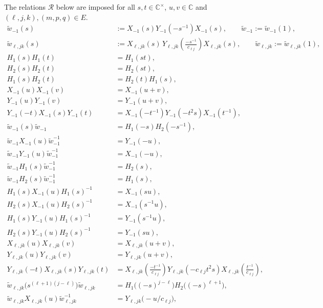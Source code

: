 \documentclass[11pt]{article}
\theoremstyle{definition}
\theoremstyle{remark}
\newcommand{\Cx}{\mathbb{C}^\times}
\newcommand{\wt}{\widetilde{w}}
\begin{document}
The relations $\mathcal R$ below are imposed for all $s,t\in\Cx$, $u,v\in\mathbb C$ and $(\ell,j,k),(m,p,q)\in E$.
\begin{align*}
\tag{Re:0} \wt_{-1}(s)&:=X_{-1}(s)Y_{-1}(-s^{-1})X_{-1}(s),\qquad \wt_{-1}:=\wt_{-1}(1),\\
\tag{Im:0} \wt_{\ell,jk}(s)&:=X_{\ell,jk}(s)\,Y_{\ell,jk}\!\left(\tfrac{-s^{-1}}{c_{\ell j}}\right)X_{\ell,jk}(s),\qquad \wt_{\ell,jk}:=\wt_{\ell,jk}(1),\\
\tag{H:1a} H_1(s)H_1(t)&=H_1(st),\\
\tag{H:1b} H_2(s)H_2(t)&=H_2(st),\\
\tag{H:2} H_1(s)H_2(t)&=H_2(t)H_1(s),\\
\tag{Re:1a} X_{-1}(u)X_{-1}(v)&=X_{-1}(u+v),\\
\tag{Re:1b} Y_{-1}(u)Y_{-1}(v)&=Y_{-1}(u+v),\\
\tag{Re:2} Y_{-1}(-t)X_{-1}(s)Y_{-1}(t)&=X_{-1}(-t^{-1})Y_{-1}(-t^2s)X_{-1}(t^{-1}),\\
\tag{Re:3} \wt_{-1}(s)\wt_{-1}&=H_1(-s)H_2(-s^{-1}),\\
\tag{Re:4a} \wt_{-1}X_{-1}(u)\wt_{-1}^{-1}&=Y_{-1}(-u),\\
\tag{Re:4b} \wt_{-1}Y_{-1}(u)\wt_{-1}^{-1}&=X_{-1}(-u),\\
\tag{Re:5a} \wt_{-1}H_1(s)\wt_{-1}^{-1}&=H_2(s),\\
\tag{Re:5b} \wt_{-1}H_2(s)\wt_{-1}^{-1}&=H_1(s),\\
\tag{Re:6a} H_1(s)X_{-1}(u)H_1(s)^{-1}&=X_{-1}(su),\\
\tag{Re:6b} H_2(s)X_{-1}(u)H_2(s)^{-1}&=X_{-1}(s^{-1}u),\\
\tag{Re:6c} H_1(s)Y_{-1}(u)H_1(s)^{-1}&=Y_{-1}(s^{-1}u),\\
\tag{Re:6d} H_2(s)Y_{-1}(u)H_2(s)^{-1}&=Y_{-1}(su),\\
\tag{Im:1a} X_{\ell,jk}(u)X_{\ell,jk}(v)&=X_{\ell,jk}(u+v),\\
\tag{Im:1b} Y_{\ell,jk}(u)Y_{\ell,jk}(v)&=Y_{\ell,jk}(u+v),\\
\tag{Im:2} Y_{\ell,jk}(-t)X_{\ell,jk}(s)Y_{\ell,jk}(t)&=X_{\ell,jk}\!\left(\tfrac{-t^{-1}}{c_{\ell j}}\right)Y_{\ell,jk}(-c_{\ell j}t^2s)X_{\ell,jk}\!\left(\tfrac{t^{-1}}{c_{\ell j}}\right),\\
\tag{Im:3} \wt_{\ell,jk}\bigl(s^{(\ell+1)(j-\ell)}\bigr)\wt_{\ell,jk}&=H_1\bigl((-s)^{j-\ell}\bigr)H_2\bigl((-s)^{\ell+1}\bigr),\\
\tag{Im:4a} \wt_{\ell,jk}X_{\ell,jk}(u)\wt_{\ell,jk}^{-1}&=Y_{\ell,jk}\bigl(-u/c_{\ell j}\bigr),\\

\end{align*}
\end{document}
